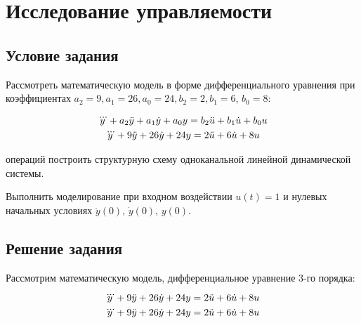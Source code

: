 \label{ch:chap1}

\section{Исследование управляемости}
 
\subsection{Условие задания}

Рассмотреть математическую модель в форме дифференциального уравнения при коэффициентах 
$a_2 = 9, a_1 = 26, a_0 = 24, b_2 = 2, b_1 = 6$, $b _0 = 8$:

\begin{gather}
	\notag
	\dddot{y} + a_2\ddot{y} + a_1\dot{y} + a_0y = b_2\ddot{u} + b_1\dot{u} + b_0u\\
	\dddot{y} + 9\ddot{y} + 26\dot{y} + 24y = 2\ddot{u} + 6\dot{u} + 8u
\end{gather}

операций построить структурную схему одноканальной линейной динамической системы.

Выполнить моделирование при входном воздействии $u(t) = 1$ и нулевых начальных условиях 
$\ddot{y}(0)$, $\dot{y}(0)$, $y(0)$.

\subsection{Решение задания}

Рассмотрим математическую модель, дифференциальное уравнение 3-го порядка:

\begin{equation}
	\notag
	\dddot{y} + 9\ddot{y} + 26\dot{y} + 24y = 2\ddot{u} + 6\dot{u} + 8u
\end{equation}
\begin{equation}
	\notag
	\dddot{y} + 9\ddot{y} + 26\dot{y} + 24y = 2\ddot{u} + 6\dot{u} + 8u
\end{equation}

